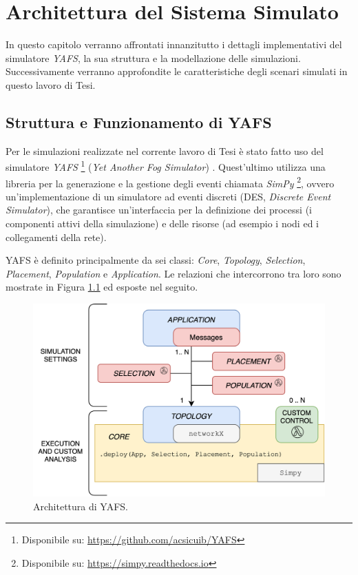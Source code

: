 \chapter{Architettura del Sistema Simulato}	
\label{chapter:architettura}

In questo capitolo verranno affrontati innanzitutto i dettagli implementativi del simulatore \textit{YAFS}, la sua struttura e la modellazione delle simulazioni. Successivamente verranno approfondite le caratteristiche degli scenari simulati in questo lavoro di Tesi.

\section{Struttura e Funzionamento di YAFS}

Per le simulazioni realizzate nel corrente lavoro di Tesi è stato fatto uso del simulatore \textit{YAFS} \footnote{Disponibile su: \url{https://github.com/acsicuib/YAFS}} (\textit{Yet Another Fog Simulator}) \cite{YAFSSimulator}. Quest'ultimo utilizza una libreria per la generazione e la gestione degli eventi chiamata \textit{SimPy} \footnote{Disponibile su: \url{https://simpy.readthedocs.io}}, ovvero un'implementazione di un simulatore ad eventi discreti (DES, \textit{Discrete Event Simulator}), che garantisce un'interfaccia per la definizione dei processi (i componenti attivi della simulazione) e delle risorse (ad esempio i nodi ed i collegamenti della rete).

YAFS è definito principalmente da sei classi: \textit{Core}, \textit{Topology}, \textit{Selection}, \textit{Placement}, \textit{Population} e \textit{Application}. Le relazioni che intercorrono tra loro sono mostrate in Figura \ref{fig:YAFS_classes} ed esposte nel seguito.

\begin{figure}[!ht]
  \includegraphics[width=12cm]{images/YAFS_classes}
  \centering
  \caption[Architettura di YAFS]{Architettura di YAFS. \cite{YAFSSimulator}}
  \label{fig:YAFS_classes}
\end{figure}

